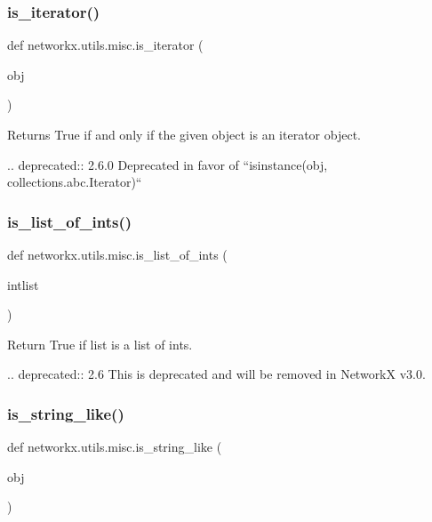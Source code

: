 \subsubsection{\texorpdfstring{is\+\_\+iterator()}{is\_iterator()}}
{\footnotesize\ttfamily def networkx.\+utils.\+misc.\+is\+\_\+iterator (\begin{DoxyParamCaption}\item[{}]{obj }\end{DoxyParamCaption})}

\begin{DoxyVerb}Returns True if and only if the given object is an iterator object.

.. deprecated:: 2.6.0
    Deprecated in favor of ``isinstance(obj, collections.abc.Iterator)``
\end{DoxyVerb}
 \mbox{\label{namespacenetworkx_1_1utils_1_1misc_af90ea0c0084848c48f7bd856353598f4}} 
\subsubsection{\texorpdfstring{is\+\_\+list\+\_\+of\+\_\+ints()}{is\_list\_of\_ints()}}
{\footnotesize\ttfamily def networkx.\+utils.\+misc.\+is\+\_\+list\+\_\+of\+\_\+ints (\begin{DoxyParamCaption}\item[{}]{intlist }\end{DoxyParamCaption})}

\begin{DoxyVerb}Return True if list is a list of ints.

.. deprecated:: 2.6
    This is deprecated and will be removed in NetworkX v3.0.
\end{DoxyVerb}
 \mbox{\label{namespacenetworkx_1_1utils_1_1misc_a616b747e99687676813d854ac515795c}} 
\subsubsection{\texorpdfstring{is\+\_\+string\+\_\+like()}{is\_string\_like()}}
{\footnotesize\ttfamily def networkx.\+utils.\+misc.\+is\+\_\+string\+\_\+like (\begin{DoxyParamCaption}\item[{}]{obj }\end{DoxyParamCaption})}

